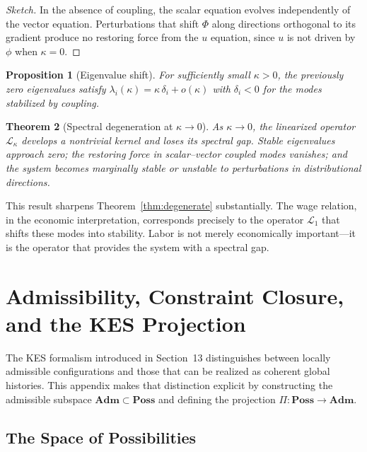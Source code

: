 \documentclass[11pt, a4paper]{article}
\theoremstyle{plain}
\newtheorem{theorem}{Theorem}[section]
\newtheorem{proposition}[theorem]{Proposition}
\theoremstyle{definition}
\newcommand{\Phifield}{\Phi}
\newcommand{\Poss}{\mathbf{Poss}}
\newcommand{\Adm}{\mathbf{Adm}}
\newcommand{\coupling}{\kappa}
\begin{document}
\begin{proof}[Sketch]
In the absence of coupling, the scalar equation evolves independently of the
vector equation. Perturbations that shift $\Phifield$ along directions
orthogonal to its gradient produce no restoring force from the $u$ equation,
since $u$ is not driven by $\phi$ when $\coupling = 0$.
\end{proof}

\begin{proposition}[Eigenvalue shift]
For sufficiently small $\coupling > 0$, the previously zero eigenvalues satisfy
$\lambda_i(\coupling) = \coupling\, \delta_i + o(\coupling)$ with $\delta_i < 0$
for the modes stabilized by coupling.
\end{proposition}

\begin{theorem}[Spectral degeneration at $\coupling \to 0$]
As $\coupling \to 0$, the linearized operator $\mathcal{L}_\coupling$ develops
a nontrivial kernel and loses its spectral gap. Stable eigenvalues approach
zero; the restoring force in scalar--vector coupled modes vanishes; and the
system becomes marginally stable or unstable to perturbations in distributional
directions.
\end{theorem}

This result sharpens Theorem~\ref{thm:degenerate} substantially. The wage
relation, in the economic interpretation, corresponds precisely to the operator
$\mathcal{L}_1$ that shifts these modes into stability. Labor is not merely
economically important---it is the operator that provides the system with a
spectral gap.

\section{Admissibility, Constraint Closure, and the KES Projection}

The KES formalism introduced in Section~13 distinguishes between locally
admissible configurations and those that can be realized as coherent global
histories. This appendix makes that distinction explicit by constructing the
admissible subspace $\Adm \subset \Poss$ and defining the projection
$\Pi : \Poss \to \Adm$.

\subsection{The Space of Possibilities}
\end{document}
